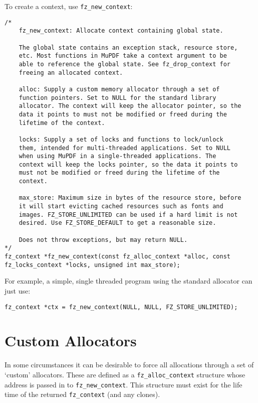 \documentclass[oneside]{book}
\begin{document}
To create a context, use \texttt{fz\_new\_context}:

\begin{lstlisting}
/*
	fz_new_context: Allocate context containing global state.

	The global state contains an exception stack, resource store,
	etc. Most functions in MuPDF take a context argument to be
	able to reference the global state. See fz_drop_context for
	freeing an allocated context.

	alloc: Supply a custom memory allocator through a set of
	function pointers. Set to NULL for the standard library
	allocator. The context will keep the allocator pointer, so the
	data it points to must not be modified or freed during the
	lifetime of the context.

	locks: Supply a set of locks and functions to lock/unlock
	them, intended for multi-threaded applications. Set to NULL
	when using MuPDF in a single-threaded applications. The
	context will keep the locks pointer, so the data it points to
	must not be modified or freed during the lifetime of the
	context.

	max_store: Maximum size in bytes of the resource store, before
	it will start evicting cached resources such as fonts and
	images. FZ_STORE_UNLIMITED can be used if a hard limit is not
	desired. Use FZ_STORE_DEFAULT to get a reasonable size.

	Does not throw exceptions, but may return NULL.
*/
fz_context *fz_new_context(const fz_alloc_context *alloc, const fz_locks_context *locks, unsigned int max_store);
\end{lstlisting}

For example, a simple, single threaded program using the standard allocator can just use:

\begin{lstlisting}
fz_context *ctx = fz_new_context(NULL, NULL, FZ_STORE_UNLIMITED);
\end{lstlisting}


\section{Custom Allocators}

In some circumstances it can be desirable to force all allocations through a set of `custom' allocators. These are defined as a \texttt{fz\_alloc\_context} structure whose address is passed in to \texttt{fz\_new\_context}. This structure must exist for the life time of the returned \texttt{fz\_context} (and any clones).
\end{document}
